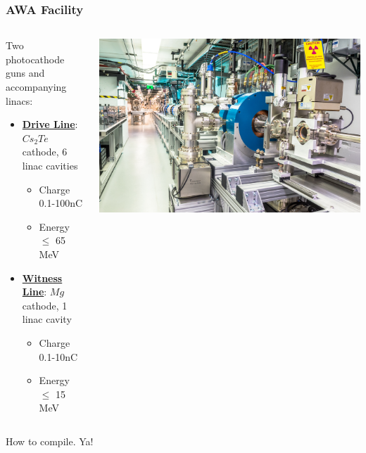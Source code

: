 \documentclass[professionalfonts]{beamer}
\begin{document}
\begin{frame}
\frametitle{AWA Facility}
\begin{columns}[T] %
	\begin{column}{.48\textwidth}
		
			Two photocathode guns and accompanying linacs:
			\begin{itemize}
				\item{\underline{\textbf{Drive Line}}: $Cs_2Te$ cathode, 6 linac cavities}
				\begin{itemize}
					\item{Charge 0.1-100nC}
					\item{Energy $\leq$ 65 MeV}
					
				\end{itemize}
				\item{\underline{\textbf{Witness Line}}: $Mg$ cathode, 1 linac cavity}
				\begin{itemize}
					\item{Charge 0.1-10nC}
					\item{Energy $\leq$ 15 MeV}
				\end{itemize}
			\end{itemize}

	\end{column}%
	\hfill%
	\begin{column}{.48\textwidth}
		\includegraphics[width=1.0\linewidth, right]{../images/drive_gun}
	\end{column}%
\end{columns}
\end{frame}

\begin{frame}{How to compile. Ya!}


\end{frame}
\end{document}
